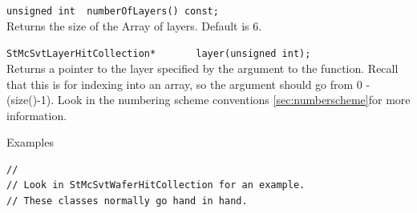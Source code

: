 \begin{Entry}
    \verb+unsigned int  numberOfLayers() const;+\\
    Returns the size of the Array of layers.  Default is 6.

    \verb+StMcSvtLayerHitCollection*       layer(unsigned int);+\\
    Returns a pointer to the layer specified by the argument to the
    function.  Recall that this is for indexing into an array, so the
    argument should go from 0 - (size()-1).  Look in the
    numbering scheme conventions \ref{sec:numberscheme}for more information.

\item[Examples]
{\footnotesize
\begin{verbatim}
//
// Look in StMcSvtWaferHitCollection for an example.
// These classes normally go hand in hand.
\end{verbatim}
}%
\end{Entry}

\clearpage
%
%
